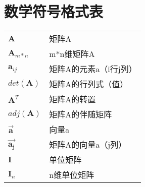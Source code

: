 \section*{数学符号格式表}
\centering
\begin{tabular}{ll}
\hline
$\mathbf{A}$ & 矩阵A \\
$\mathbf{A}_{m*n}$ & m*n维矩阵A \\
$\mathbf{a}_{ij}$ & 矩阵A的元素a（i行j列） \\
$\mathit{det}(\mathbf{A})$ & 矩阵A的行列式（值） \\
$\mathbf{A}^{T}$ & 矩阵A的转置 \\
$\mathit{adj}(\mathbf{A})$ & 矩阵A的伴随矩阵 \\
$\mathbf{\vec{a}}$ & 向量a \\
$\mathbf{\vec{a_{j}}}$ & 矩阵A的向量a（j列） \\
$\mathbf{I}$ & 单位矩阵 \\
$\mathbf{I}_{n}$ & n维单位矩阵 \\
\hline
\end{tabular}